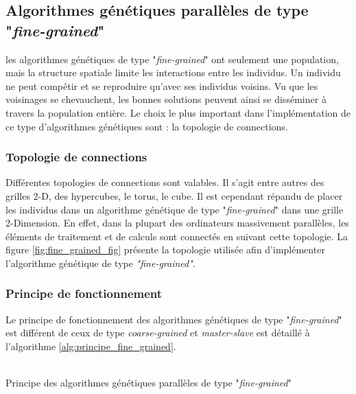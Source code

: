 \documentclass[12pt,a4paper]{article}
\begin{document}
	\subsection{Algorithmes génétiques parallèles de type "\emph{fine-grained}"}
	les algorithmes génétiques de type "\emph{fine-grained}" ont seulement une population, mais la structure spatiale limite les interactions entre les individus. Un individu ne peut compétir et se reproduire qu'avec ses individus voisins. Vu que les voisinages se chevauchent, les bonnes solutions peuvent ainsi se disséminer à travers la population entière. Le choix le plus important dans l'implémentation de ce type d'algorithmes génétiques sont : la topologie de connections.
	\subsubsection{Topologie de connections}
	Différentes topologies de connections sont valables. Il s'agit entre autres des grilles 2-D, des hypercubes, le torus, le cube. Il est cependant répandu de placer les individus dans un algorithme génétique de type "\emph{fine-grained}" dans une grille 2-Dimension. En effet, dans la plupart des ordinateurs massivement parallèles, les éléments de traitement et de calculs sont connectés en suivant cette topologie. La figure \ref{fig:fine_grained_fig} présente la topologie utilisée afin d'implémenter l'algorithme génétique de type \emph{"fine-grained"}.
	
	\subsubsection{Principe de fonctionnement}
	Le principe de fonctionnement des algorithmes génétiques de type "\emph{fine-grained}" est différent de ceux de type \emph{coarse-grained} et \emph{master-slave} est détaillé à l'algorithme \ref{alg:principe_fine_grained}. \\
	\\
	\begin{algorithm}[H]
		\label{alg:principe_fine_grained}
 		\caption{Principe des algorithmes génétiques parallèles de type "\emph{fine-grained}"}
 		\BlankLine
 		\BlankLine
	\end{algorithm}
	
\end{document}
